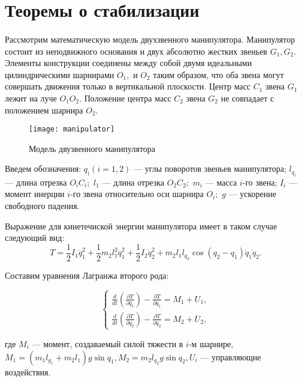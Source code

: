 \section{Теоремы о стабилизации} \label{p21}
\paragraph{}
Рассмотрим математическую модель двухзвенного манипулятора. Манипулятор состоит из неподвижного основания и двух абсолютно жестких звеньев $G_1, G_2$. Элементы конструкции соединены между собой двумя идеальными цилиндрическими шарнирами $O_1,$ и $O_2$ таким образом, что оба звена могут совершать движения только в вертикальной плоскости. Центр масс $C_1$ звена $G_1$ лежит на луче $O_1 O_2.$ Положение центра масс $C_2$ звена $G_2$ не совпадает с положением шарнира $O_2$.

 \begin{figure}[h]
 	\centering
 	\texttt{[image: manipulator]}
 	\caption{Модель двузвенного манипулятора}
 	\label{fig:manip1}
 \end{figure}

Введем обозначения: $q_i (i=1, 2)$ --- углы поворотов звеньев манипулятора; $l_{q_i}$ --- длина отрезка $O_i C_i;$ $l_1$ --- длина отрезка $O_2 C_2;$ $m_i$  ---  масса   $i$-го звена;   $I_i$ --- момент инерции  $i$-го звена относительно оси шарнира $O_i;$ $g$ --- ускорение свободного падения.

Выражение для кинетечиской энергии манипулятора имеет в таком случае следующий вид:
\begin{equation}
T = \frac{1}{2} I_1 \dot q_1^2 + \frac12 m_2 l_1^2 \dot q_1^2 + \frac12 I_2 \dot q_2^2 + m_2 l_1 l_{q_2} \cos (q_2 - q_1) \dot q_1 \dot q_2.
\end{equation}

Составим уравнения Лагранжа второго рода:

\begin{equation}
\begin{cases}
\frac{d}{dt} (\frac{\partial T}{\partial \dot q_1}) - \frac{\partial T}{\partial q_1} = M_1 + U_1, 
\\
\frac{d}{dt} (\frac{\partial T}{\partial \dot q_2}) - \frac{\partial T}{\partial q_2} = M_2 + U_2,
\end{cases}
\end{equation}

где $M_i$ --- момент, создаваемый силой тяжести в $i$-м шарнире, $M_1 = (m_1 l_{g_1} + m_2 l_1) g \sin q_1, M_2 = m_2 l_{q_2} g \sin q_2, U_i $ --- управляющие воздействия.

